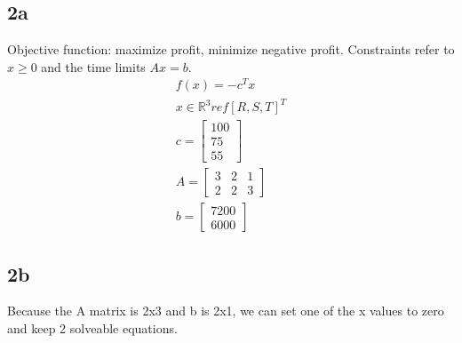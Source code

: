 \subsection{2a}
Objective function: maximize profit, minimize negative profit. Constraints refer to $x\geq 0$ and the time limits $Ax=b$.
\begin{subequations}
    \begin{align}
        f(x) = -c^T x \\ 
        x \in \mathbb{R}^3 ref [R,S,T]^T \\ 
        c = \begin{bmatrix}
            100 \\ 75 \\ 55
        \end{bmatrix} \\ 
        A = \begin{bmatrix}
            3 & 2 & 1 \\ 
            2 & 2 & 3
        \end{bmatrix} \\ 
        b = \begin{bmatrix}
            7200 \\ 
            6000
        \end{bmatrix}
    \end{align}
\end{subequations}
\subsection{2b}
Because the A matrix is 2x3 and b is 2x1, we can set one of the x values to zero and keep 2 solveable equations.

